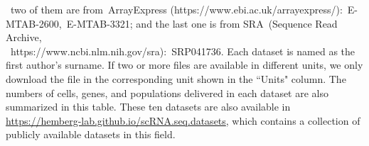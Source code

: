 \begin{table}[!htbp]
\begin{tablenotes}
        ~two of them are from~ArrayExpress (https://www.ebi.ac.uk/arrayexpress/):~E-MTAB-2600,~E-MTAB-3321; 
        and the last one is from SRA~(Sequence Read Archive,\\~https://www.ncbi.nlm.nih.gov/sra):~SRP041736. 
        Each dataset is named as the first author's surname. 
        If two or more files are available in different units, 
        we only download the file in the corresponding unit shown in the ``Units" column.
        The numbers of cells, genes, and populations delivered in each dataset are also summarized in this table.
        These ten datasets are also available in \url{https://hemberg-lab.github.io/scRNA.seq.datasets}, 
        which contains a collection of publicly available datasets in this field.
      \end{tablenotes}
    \end{table}

